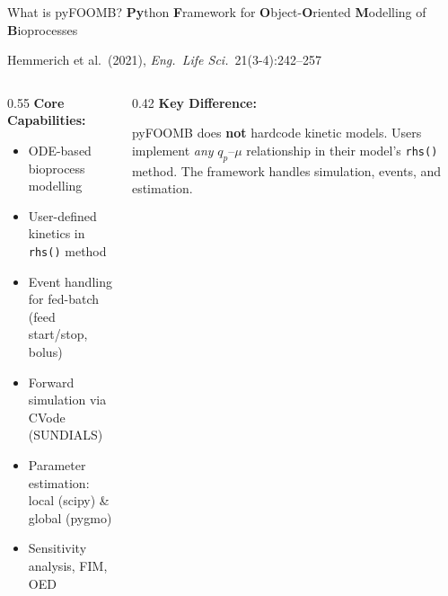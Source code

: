 \documentclass[aspectratio=169, 11pt]{beamer}
\begin{document}
\begin{frame}{What is pyFOOMB?}
  \textbf{Py}thon \textbf{F}ramework for \textbf{O}bject-\textbf{O}riented \textbf{M}odelling of \textbf{B}ioprocesses

  \vspace{0.2cm}
  {\small Hemmerich et al.\ (2021), \textit{Eng.\ Life Sci.}\ 21(3-4):242--257}

  \vspace{0.3cm}
  \begin{columns}[T]
    \begin{column}{0.55\textwidth}
      \textbf{Core Capabilities:}
      \begin{itemize}
        \item ODE-based bioprocess modelling
        \item User-defined kinetics in \texttt{rhs()} method
        \item Event handling for fed-batch (feed start/stop, bolus)
        \item Forward simulation via CVode (SUNDIALS)
        \item Parameter estimation: local (scipy) \& global (pygmo)
        \item Sensitivity analysis, FIM, OED
      \end{itemize}
    \end{column}
    \begin{column}{0.42\textwidth}
      \textbf{Key Difference:}
      \begin{block}{}
        pyFOOMB does \textbf{not} hardcode kinetic models.
        Users implement \textit{any} $q_p$--$\mu$ relationship
        in their model's \texttt{rhs()} method. The framework handles
        simulation, events, and estimation.
      \end{block}
    \end{column}
  \end{columns}
\end{frame}
\end{document}

